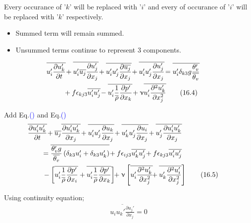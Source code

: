 \documentclass[fleqn,10pt]{SelfArx} %
\newcommand{\myeqref}[1]{Eq.\textcolor{blue}{\textup{(\getrefnumber{#1})}}}
\begin{document}
Every occurance of '\(k\)' will be replaced with '\(i\)' and every of occurance of '\(i\)' will be replaced with '\(k\)' respectively.
\begin{itemize}[noitemsep]
	\item Summed term will remain summed.
	\item Unsummed terms continue to represent 3 components.
\end{itemize}

\begin{align*}
	\mspace{-28mu} \overline{u_i'\frac{\partial u_k'}{\partial t}} \! &+ \overline{u_i'\overline{u_j}\frac{\partial u_j'}{\partial x_j}} \! + \overline{u_i'u_j'\frac{\partial \overline{u_j}}{\partial x_j}} \! + \overline{u_i'u_j'\frac{\partial u_j'}{\partial x_j}} \! = \overline{u_i'\delta_{k3}g\frac{\theta_v'}{\overline{\theta_v}}} \\ &\! + f\epsilon_{kj3}\overline{u_i'u_j'} \! - \overline{u_i'\frac{1}{\overline{\rho}}\frac{\partial p'}{\partial x_k}} \! + \upnu\overline{u_i'\frac{\partial^2 u_k'}{\partial x_j^2}} \tag{16.4} \label{eq:16.4}
\end{align*}

Add \myeqref{eq:16.3} and \myeqref{eq:16.4}
\begin{align*}
	\mspace{-30mu} \overline{\frac{\partial u_i'u_k'}{\partial t}} \! &+ \overline{u_j}\overline{\frac{\partial u_i'u_k'}{\partial x_j}} \! + \overline{u_i'u_j'\frac{\partial u_k}{\partial x_j}} \! + \overline{u_k'u_j'\frac{\partial u_i}{\partial x_j}} \! + \overline{u_j'\frac{\partial u_i'u_k'}{\partial x_j}} \\ &\!\!\!\! = \overline{\frac{\theta_v'g}{\overline{\theta_v}}\left(\delta_{k3}u_i' + \delta_{k3}u_k'\right)} \!+ f\epsilon_{ij3}\overline{u_k'u_j'} \! + f\epsilon_{kj3}\overline{u_i'u_j'} \\ &\!\!\! - \left[\overline{u_i'\frac{1}{\overline{\rho}}\frac{\partial p'}{\partial x_i}} + \overline{u_i'\frac{1}{\overline{\rho}}\frac{\partial p'}{\partial x_k}}\right] \!\! + \upnu\left[\overline{u_i'\frac{\partial^2 u_k'}{\partial x_j^2}} \!\! + \overline{u_k'\frac{\partial^2 u_i'}{\partial x_j^2}}\right] \tag{16.5} \label{eq:16.5}
\end{align*}

Using continuity equation;
\begin{align*}
	\overline{u_iu_k'\frac{\partial u_j'}{\partial x_j}} = 0
\end{align*}
\end{document}
